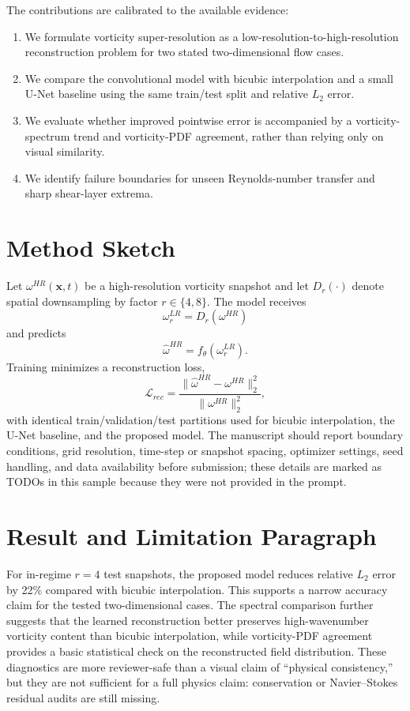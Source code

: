 \documentclass[11pt]{article}
\begin{document}
The contributions are calibrated to the available evidence:
\begin{enumerate}
    \item We formulate vorticity super-resolution as a low-resolution-to-high-resolution reconstruction problem for two stated two-dimensional flow cases.
    \item We compare the convolutional model with bicubic interpolation and a small U-Net baseline using the same train/test split and relative $L_2$ error.
    \item We evaluate whether improved pointwise error is accompanied by a vorticity-spectrum trend and vorticity-PDF agreement, rather than relying only on visual similarity.
    \item We identify failure boundaries for unseen Reynolds-number transfer and sharp shear-layer extrema.
\end{enumerate}

\section{Method Sketch}
Let $\omega^{HR}(\mathbf{x},t)$ be a high-resolution vorticity snapshot and let $D_r(\cdot)$ denote spatial downsampling by factor $r\in\{4,8\}$. The model receives
\begin{equation}
    \omega^{LR}_r = D_r\left(\omega^{HR}\right)
\end{equation}
and predicts
\begin{equation}
    \hat{\omega}^{HR}=f_\theta(\omega^{LR}_r).
\end{equation}
Training minimizes a reconstruction loss,
\begin{equation}
    \mathcal{L}_{rec}=\frac{\|\hat{\omega}^{HR}-\omega^{HR}\|_2^2}{\|\omega^{HR}\|_2^2},
\end{equation}
with identical train/validation/test partitions used for bicubic interpolation, the U-Net baseline, and the proposed model. The manuscript should report boundary conditions, grid resolution, time-step or snapshot spacing, optimizer settings, seed handling, and data availability before submission; these details are marked as TODOs in this sample because they were not provided in the prompt.

\section{Result and Limitation Paragraph}
For in-regime $r=4$ test snapshots, the proposed model reduces relative $L_2$ error by 22\% compared with bicubic interpolation. This supports a narrow accuracy claim for the tested two-dimensional cases. The spectral comparison further suggests that the learned reconstruction better preserves high-wavenumber vorticity content than bicubic interpolation, while vorticity-PDF agreement provides a basic statistical check on the reconstructed field distribution. These diagnostics are more reviewer-safe than a visual claim of ``physical consistency,'' but they are not sufficient for a full physics claim: conservation or Navier--Stokes residual audits are still missing.
\end{document}
